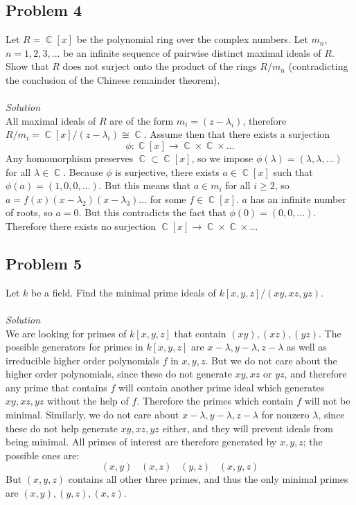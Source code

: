 \documentclass[12 pt]{article}
\DeclareMathOperator {\C} {\mathbb{C}}
\begin{document}
\subsection*{Problem 4}
Let $R = \C[x]$ be the polynomial ring over the complex numbers. Let $m_n$, $n = 1, 2, 3, ...$ be an infinite sequence of pairwise distinct maximal ideals of $R$. Show that $R$ does not surject onto the product of the rings $R/m_n$ (contradicting the conclusion of the Chinese remainder theorem).
\\
\\
\emph{Solution}
\\
All maximal ideals of $R$ are of the form $m_i = (z-\lambda_i)$, therefore $R/m_i = \C[x]/(z-\lambda_i) \cong \C$. Assume then that there exists a surjection
\[     \phi: \C[x] \to \C \times \C \times \dots   \]
Any homomorphism preserves $\C \subset \C[x]$, so we impose $\phi(\lambda) = (\lambda, \lambda, \dots )$ for all $\lambda\in \C$. Because $\phi$ is surjective, there exists $a\in \C[x]$ such that $\phi(a) = (1, 0 , 0, \dots)$. But this means that $a\in m_i$ for all $i\geq 2$, so $a = f(x) (x-\lambda_2)(x-\lambda_3) \dots$ for some $f\in \C[x]$. $a$ has an infinite number of roots, so $a=0$. But this contradicts the fact that $\phi(0) = (0, 0, \dots)$. Therefore there exists no surjection $\C[x] \to \C \times \C \times \dots$

\subsection*{Problem 5}
Let $k$ be a field. Find the minimal prime ideals of $k[x, y, z]/(xy, xz, yz)$.
\\
\\
\emph{Solution}
\\
We are looking for primes of $k[x,y,z]$ that contain $(xy), (xz), (yz)$. The possible generators for primes in $k[x,y,z]$ are $x-\lambda, y-\lambda, z-\lambda$ as well as irreducible higher order polynomials $f$ in $x,y,z$. But we do not care about the higher order polynomials, since these do not generate $xy, xz$ or $yz$, and therefore any prime that contains $f$ will contain another prime ideal which generates $xy, xz, yz$ without the help of $f$. Therefore the primes which contain $f$ will not be minimal. Similarly, we do not care about $x-\lambda, y-\lambda, z-\lambda$ for nonzero $\lambda$, since these do not help generate $xy, xz, yz$ either, and they will prevent ideals from being minimal. All primes of interest are therefore generated by $x, y, z$; the possible ones are:
\[      (x,y) \;\;\; (x,z) \;\;\; (y,z) \;\;\; (x,y,z)      \]
But $(x,y,z)$ contains all other three primes, and thus the only minimal primes are $(x,y), (y,z), (x,z)$.
\end{document}
